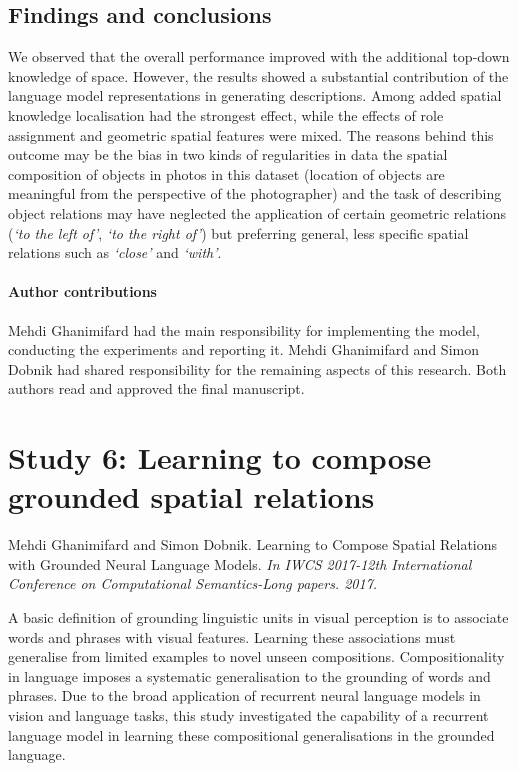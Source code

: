 \subsection{Findings and conclusions}
We observed that the overall performance improved with the additional top-down knowledge of space. 
However, the results showed a substantial contribution of the %
language model representations in generating descriptions. 
Among added spatial knowledge localisation had the strongest effect, while the effects of role assignment and geometric spatial features were mixed. 
The reasons behind this outcome may be the bias in two kinds of regularities in data \textemdash the spatial composition of objects in photos in this dataset (location of objects are meaningful from the perspective of the photographer) and the task of describing object relations may have neglected the application of certain geometric relations (\emph{`to the left of'}, \emph{`to the right of'})
but preferring general, less specific spatial relations such as \emph{`close'} and \emph{`with'}.

\paragraph{Author contributions}
Mehdi Ghanimifard had the main responsibility for implementing the model, conducting the experiments and reporting it. Mehdi Ghanimifard and Simon Dobnik had shared responsibility for the remaining aspects of this research. Both authors read and approved the final manuscript.

\section{Study 6: Learning to compose grounded spatial relations}
Mehdi Ghanimifard and Simon Dobnik. 
Learning to Compose Spatial Relations with Grounded Neural Language Models.
\textit{In IWCS 2017-12th International Conference on Computational Semantics-Long papers. 2017.}


A basic definition of grounding linguistic units in visual perception is to associate words and phrases with visual features. 
Learning these associations must generalise from limited examples to 
novel
unseen compositions.
Compositionality in language imposes a systematic generalisation to the grounding of words and phrases. 
Due to the broad application of recurrent neural language models in vision and language tasks, this study investigated the capability of a recurrent language model in learning these compositional generalisations in the grounded language.

